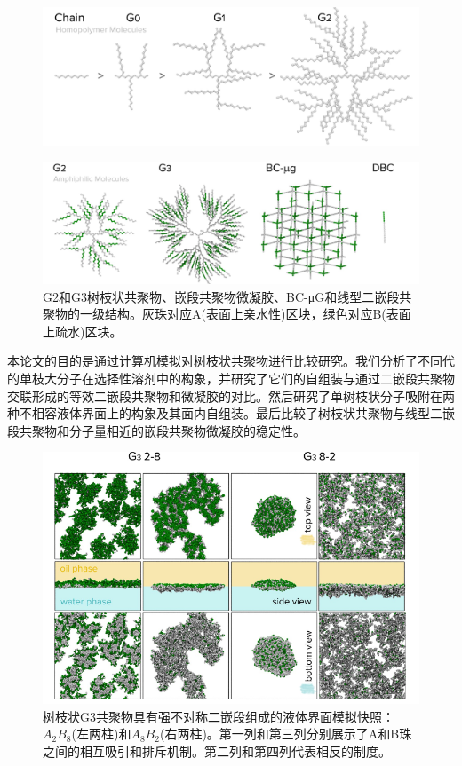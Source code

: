 \documentclass[12pt,a4paper]{article}
\numberwithin{equation}{section}
\begin{document}
\begin{figure}[H]
\centering
\includegraphics[scale=0.4]{./figures/19.png}
\caption{}
\end{figure}

\begin{figure}[H]
\centering
\includegraphics[scale=0.4]{./figures/20.png}
\caption{G2和G3树枝状共聚物、嵌段共聚物微凝胶、BC-μG和线型二嵌段共聚物的一级结构。灰珠对应A(表面上亲水性)区块，绿色对应B(表面上疏水)区块。}
\end{figure}
本论文的目的是通过计算机模拟对树枝状共聚物进行比较研究。我们分析了不同代的单枝大分子在选择性溶剂中的构象，并研究了它们的自组装与通过二嵌段共聚物交联形成的等效二嵌段共聚物和微凝胶的对比。然后研究了单树枝状分子吸附在两种不相容液体界面上的构象及其面内自组装。最后比较了树枝状共聚物与线型二嵌段共聚物和分子量相近的嵌段共聚物微凝胶的稳定性。
\begin{figure}[H]
\centering
\includegraphics[scale=0.4]{./figures/21.png}
\caption{树枝状G3共聚物具有强不对称二嵌段组成的液体界面模拟快照：$A_2B_8$(左两柱)和$A_8B_2$(右两柱)。第一列和第三列分别展示了A和B珠之间的相互吸引和排斥机制。第二列和第四列代表相反的制度。}
\end{figure}
\end{document}
